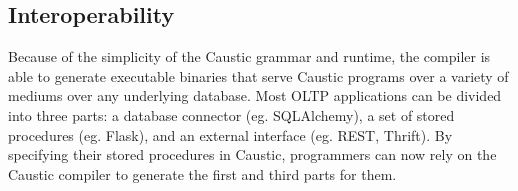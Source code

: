 \documentclass[12pt]{article}
\begin{document}
  \subsection{Interoperability}
    Because of the simplicity of the Caustic grammar and runtime, the compiler is able to generate
    executable binaries that serve Caustic programs over a variety of mediums over any underlying
    database. Most OLTP applications can be divided into three parts: a database connector
    (eg. SQLAlchemy), a set of stored procedures (eg. Flask), and an external interface
    (eg. REST, Thrift). By specifying their stored procedures in Caustic, programmers can now rely
    on the Caustic compiler to generate the first and third parts for them.
\end{document}
